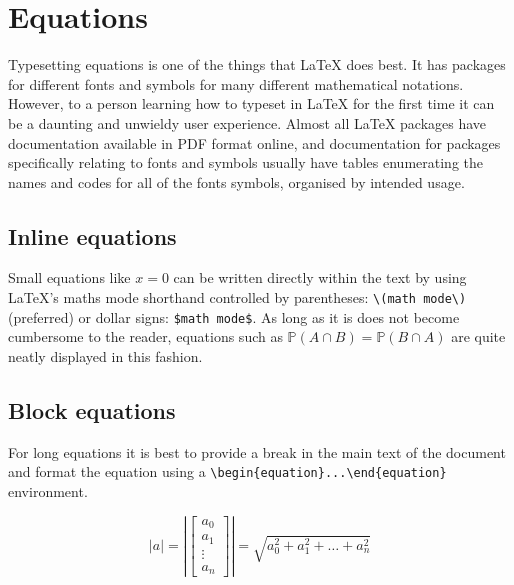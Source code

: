 \section{Equations}
	\label{sec:typesetting_equations}
	
Typesetting equations is one of the things that \LaTeX{} does best. It has packages for different fonts and symbols for many different mathematical notations.
However, to a person learning how to typeset in \LaTeX{} for the first time it can be a daunting and unwieldy user experience.
Almost all \LaTeX{} packages have documentation available in PDF format online, and documentation for packages specifically relating to fonts and symbols usually have tables enumerating the names and codes for all of the fonts symbols, organised by intended usage. 


	\subsection{Inline equations}

Small equations like \(x = 0\) can be written directly within the text by using \LaTeX{}'s maths mode shorthand controlled by parentheses: \lstinline|\(math mode\)| (preferred) or dollar signs: \lstinline|$math mode$|.
As long as it is does not become cumbersome to the reader, equations such as \(\mathbb{P}({A} \cap {B}) = \mathbb{P}({B} \cap {A})\) are quite neatly displayed in this fashion. 


	\subsection{Block equations}

For long equations it is best to provide a break in the main text of the document and format the equation using a \lstinline|\begin{equation}...\end{equation}| environment. 

		\begin{equation} \label{eq:veclen}
			\left\lvert a \right\rvert = \left\lvert \left[\begin{array}{c} a_0\\ a_1\\ \vdots\\ a_n\end{array}\right] \right\rvert = \sqrt{a_0^2 + a_1^2 + \hdots + a_n^2}
		\end{equation}
		

